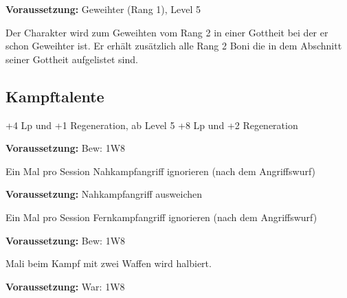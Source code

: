 \documentclass[../../Heldenanleitung2]{subfiles}
\begin{document}
\begin{multicols}{2}
\begin{tcolorbox}[title={Geweihter (Rang 2)}, colbacktitle=gray]    
	\textbf{Voraussetzung:} Geweihter (Rang 1), Level 5
	\vspace{0.2cm}	
	
   Der Charakter wird zum Geweihten vom Rang 2 in einer Gottheit bei der er schon Geweihter ist. Er erhält zusätzlich alle Rang 2 Boni die in dem Abschnitt seiner Gottheit aufgelistet sind.
\end{tcolorbox}

\end{multicols}

\subsection{Kampftalente}
\begin{multicols}{2}

\begin{tcolorbox}[title={Abhärtung},colbacktitle=red, coltitle=black]    
   +4 Lp und +1 Regeneration, ab Level 5 +8 Lp und +2 Regeneration
\end{tcolorbox}  


\begin{tcolorbox}[title={Nahkampfangriff ausweichen},colbacktitle=red, coltitle=black]
	\textbf{Voraussetzung:} Bew: 1W8
	\vspace{0.2cm}	
	
   Ein Mal pro Session Nahkampfangriff ignorieren (nach dem Angriffswurf)
\end{tcolorbox}

\begin{tcolorbox}[title={Fernkampfangriff ausweichen},colbacktitle=red, coltitle=black]    
	\textbf{Voraussetzung:} Nahkampfangriff ausweichen
	\vspace{0.2cm}	
	
   Ein Mal pro Session Fernkampfangriff ignorieren (nach dem Angriffswurf)
\end{tcolorbox}

\begin{tcolorbox}[title={Kampf mit zwei Waffen},colbacktitle=red, coltitle=black]    
	\textbf{Voraussetzung:} Bew: 1W8
	\vspace{0.2cm}
	
   Mali beim Kampf mit zwei Waffen wird halbiert.
\end{tcolorbox}

\begin{tcolorbox}[title={Kampfreflexe},colbacktitle=red, coltitle=black]    
	\textbf{Voraussetzung:} War: 1W8
	\vspace{0.2cm}
	

\end{tcolorbox}
\end{multicols}
\end{document}

